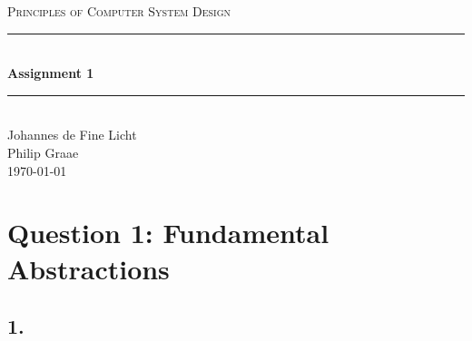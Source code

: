 \documentclass[12pt]{article}
\newcommand{\HRule}{\rule{\linewidth}{0.5mm}}
\begin{document}
\begin{center}
\textsc{\LARGE Principles of Computer System Design}\\[0.3cm] %
\HRule \\[0.4cm]
{ \huge \bfseries Assignment 1} %
\HRule \\[0.4cm]
\large
Johannes de Fine Licht %
\\Philip Graae
\\\today
\end{center}

\section*{Question 1: Fundamental Abstractions} %

\subsection*{1.} %
\end{document}
